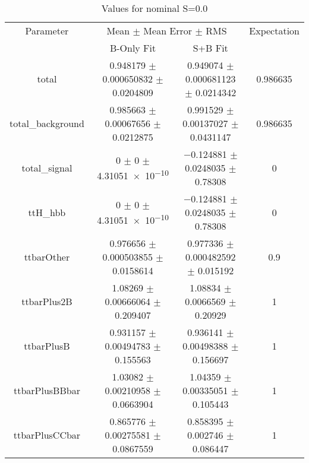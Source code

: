 \begin{table}
\centering
\caption{Values for nominal S=0.0}
\begin{tabular}{cccc}
\toprule
Parameter & \multicolumn{2}{c}{Mean $\pm$ Mean Error $\pm$ RMS} & Expectation\\
 & B-Only Fit & S+B Fit & \\
\midrule
total & \num{0.948179} $\pm$ \num{0.000650832} $\pm$ \num{0.0204809} & \num{0.949074} $\pm$ \num{0.000681123} $\pm$ \num{0.0214342} & \num{0.986635}\\
total\_background & \num{0.985663} $\pm$ \num{0.00067656} $\pm$ \num{0.0212875} & \num{0.991529} $\pm$ \num{0.00137027} $\pm$ \num{0.0431147} & \num{0.986635}\\
total\_signal & \num{0} $\pm$ \num{0} $\pm$ \num{4.31051e-10} & \num{-0.124881} $\pm$ \num{0.0248035} $\pm$ \num{0.78308} & \num{0}\\
ttH\_hbb & \num{0} $\pm$ \num{0} $\pm$ \num{4.31051e-10} & \num{-0.124881} $\pm$ \num{0.0248035} $\pm$ \num{0.78308} & \num{0}\\
ttbarOther & \num{0.976656} $\pm$ \num{0.000503855} $\pm$ \num{0.0158614} & \num{0.977336} $\pm$ \num{0.000482592} $\pm$ \num{0.015192} & \num{0.9}\\
ttbarPlus2B & \num{1.08269} $\pm$ \num{0.00666064} $\pm$ \num{0.209407} & \num{1.08834} $\pm$ \num{0.0066569} $\pm$ \num{0.20929} & \num{1}\\
ttbarPlusB & \num{0.931157} $\pm$ \num{0.00494783} $\pm$ \num{0.155563} & \num{0.936141} $\pm$ \num{0.00498388} $\pm$ \num{0.156697} & \num{1}\\
ttbarPlusBBbar & \num{1.03082} $\pm$ \num{0.00210958} $\pm$ \num{0.0663904} & \num{1.04359} $\pm$ \num{0.00335051} $\pm$ \num{0.105443} & \num{1}\\
ttbarPlusCCbar & \num{0.865776} $\pm$ \num{0.00275581} $\pm$ \num{0.0867559} & \num{0.858395} $\pm$ \num{0.002746} $\pm$ \num{0.086447} & \num{1}\\
\bottomrule
\end{tabular}
\end{table}